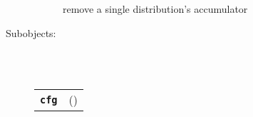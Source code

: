 \begin{description}
\begin{description}
        remove a single distribution's accumulator

    \end{description}

  \item[Subobjects:] \hfill \\
\ 
    \begin{tabular}{ll}
      \texttt{\textbf{cfg}} & (\Jref{module}{Dscfg}) \\
    \end{tabular}
\vspace{3mm}

\end{description}


